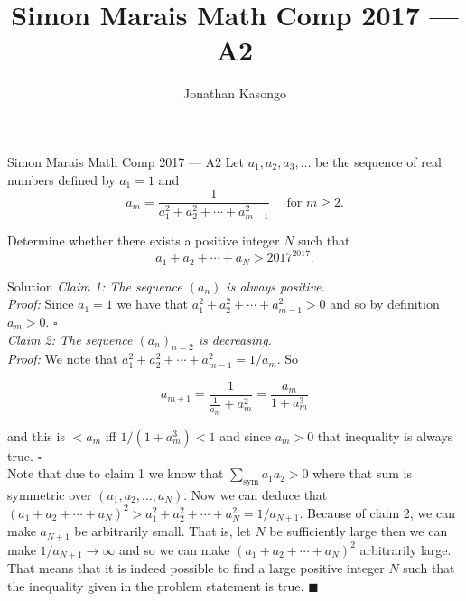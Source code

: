 \documentclass{article}
\author{Jonathan Kasongo}
\title{Simon Marais Math Comp 2017 --- A2}
\begin{document}
\maketitle

\begin{problem}{Simon Marais Math Comp 2017 --- A2}
Let $a_1, a_2, a_3, \ldots$ be the sequence of real numbers defined by
$a_1=1$ and
$$
a_m=\frac{1}{a_1^2+a_2^2+\cdots+a_{m-1}^2} \quad \text { for } m \geq 2 .
$$

Determine whether there exists a positive integer $N$ such that
$$
a_1+a_2+\cdots+a_N>2017^{2017} .
$$
\end{problem}

\begin{solution}{Solution}
\textit{Claim 1: The sequence $(a_n)$ is always positive.}\\

\textit{Proof: } Since $a_1 = 1$ we have that
$a_1^2 + a_2^2 + \cdots + a_{m-1}^2 > 0$ and so by definition $a_m > 0$.
$\square$ \\

\textit{Claim 2: The sequence $(a_n)_{n=2}$ is decreasing.}\\

\textit{Proof: } We note that $a_1^2 + a_2^2 + \cdots + a_{m-1}^2 = 1/a_m$.
So

$$
a_{m+1} = \frac{1}{\frac{1}{a_m} + a_m^2} = \frac{a_m}{1 + a_m^3}
$$

and this is $< a_m$ iff $1/(1 + a_m^3) < 1$ and since $a_m > 0$ that
inequality is always true. $\square$\\

Note that due to claim 1 we know that $\sum_{\text{sym}} a_1 a_2 > 0$ where
that sum is symmetric over $(a_1, a_2, \ldots, a_N)$. Now we can deduce that
$(a_1 + a_2 + \cdots + a_N)^2 > a_1^2 + a_2^2 + \cdots + a_N^2 = 1/a_{N+1}$.
Because of claim 2, we can make $a_{N+1}$ be arbitrarily small. That is,
let $N$ be sufficiently large then we can make $1/a_{N+1} \rightarrow
\infty$ and so we can make $(a_1 + a_2 + \cdots + a_N)^2$ arbitrarily
large. \\

That means that it is indeed possible to find a large positive integer $N$
such that the inequality given in the problem statement is true.
$\blacksquare$
\end{solution}
\end{document}
